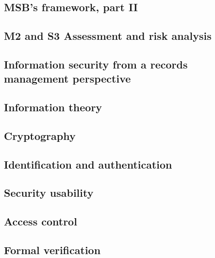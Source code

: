 \subsection{MSB's framework, part II}


\subsection{M2 and S3 Assessment and risk analysis}


\subsection{Information security from a records management perspective}


\subsection{Information theory}


\subsection{Cryptography}


\subsection{Identification and authentication}


\subsection{Security usability}


\subsection{Access control}


%

\subsection{Formal verification}


